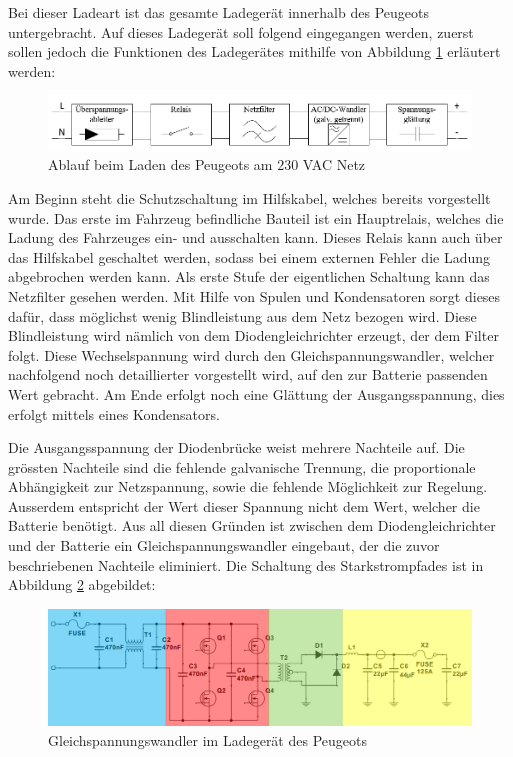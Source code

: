 \newpage

Bei dieser Ladeart ist das gesamte Ladegerät innerhalb des Peugeots untergebracht. Auf dieses Ladegerät soll folgend eingegangen werden, zuerst sollen jedoch die Funktionen des Ladegerätes mithilfe von Abbildung \ref{fig:Laden_Peugeot} erläutert werden:

\begin{figure}[h]
	\centering
		\includegraphics[width=1.00\textwidth]{images/Laden_Peugeot.PNG}
	\caption{Ablauf beim Laden des Peugeots am $230$ VAC Netz}
	\label{fig:Laden_Peugeot}
\end{figure}

Am Beginn steht die Schutzschaltung im Hilfskabel, welches bereits vorgestellt wurde. Das erste im Fahrzeug befindliche Bauteil ist ein Hauptrelais, welches die Ladung des Fahrzeuges ein- und ausschalten kann. Dieses Relais kann auch über das Hilfskabel geschaltet werden, sodass bei einem externen Fehler die Ladung abgebrochen werden kann. Als erste Stufe der eigentlichen Schaltung kann das Netzfilter gesehen werden. Mit Hilfe von Spulen und Kondensatoren sorgt dieses dafür, dass möglichst wenig Blindleistung aus dem Netz bezogen wird. Diese Blindleistung wird nämlich von dem Diodengleichrichter erzeugt, der dem Filter folgt. Diese Wechselspannung wird durch den Gleichspannungswandler, welcher nachfolgend noch detaillierter vorgestellt wird, auf den zur Batterie passenden Wert gebracht. Am Ende erfolgt noch eine Glättung der Ausgangsspannung, dies erfolgt mittels eines Kondensators.

Die Ausgangsspannung der Diodenbrücke weist mehrere Nachteile auf. Die grössten Nachteile sind die fehlende galvanische Trennung, die proportionale Abhängigkeit zur Netzspannung, sowie die fehlende Möglichkeit zur Regelung. Ausserdem entspricht der Wert dieser Spannung nicht dem Wert, welcher die Batterie benötigt. Aus all diesen Gründen ist zwischen dem Diodengleichrichter und der Batterie ein Gleichspannungswandler eingebaut, der die zuvor beschriebenen Nachteile eliminiert. Die Schaltung des Starkstrompfades ist in Abbildung \ref{fig:Ladegeraet_Peugeot} abgebildet:

\begin{figure}[h]
	\centering
		\includegraphics[width=1.00\textwidth]{images/Ladegeraet_Peugeot.PNG}
	\caption{Gleichspannungswandler im Ladegerät des Peugeots}
	\label{fig:Ladegeraet_Peugeot}
\end{figure}

